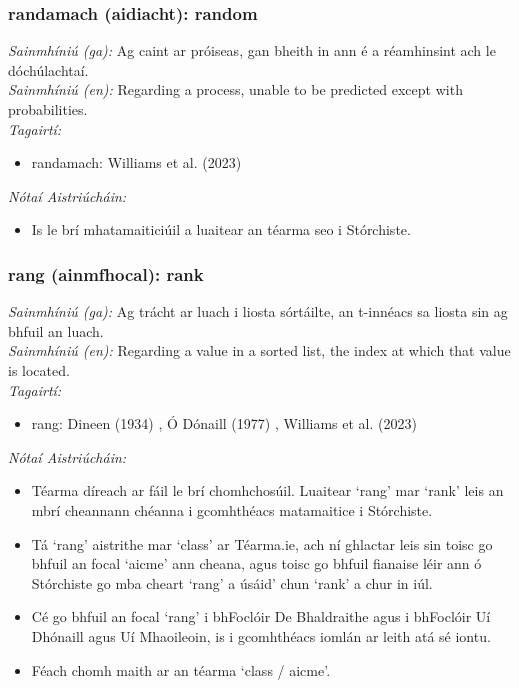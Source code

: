 \subsubsection*{randamach (aidiacht): random}
 \noindent \textit{Sainmhíniú (ga):} Ag caint ar próiseas, gan bheith in ann é a réamhinsint ach le dóchúlachtaí.
\\
 \noindent \textit{Sainmhíniú (en):} Regarding a process, unable to be predicted except with probabilities.
\\
 \noindent \textit{Tagairtí:}
\begin{itemize}
	\item randamach: Williams et al. (2023) \cite{storchiste}
\end{itemize}

 \noindent \textit{Nótaí Aistriúcháin:}
\begin{itemize}
	\item Is le brí mhatamaiticiúil a luaitear an téarma seo i Stórchiste.
\end{itemize}


\subsubsection*{rang (ainmfhocal): rank}
 \noindent \textit{Sainmhíniú (ga):} Ag trácht ar luach i liosta sórtáilte, an t-innéacs sa liosta sin ag bhfuil an luach.
\\
 \noindent \textit{Sainmhíniú (en):} Regarding a value in a sorted list, the index at which that value is located.
\\
 \noindent \textit{Tagairtí:}
\begin{itemize}
	\item rang: Dineen (1934) \cite{dineen}, Ó Dónaill (1977) \cite{odonaill}, Williams et al. (2023) \cite{storchiste}
\end{itemize}

 \noindent \textit{Nótaí Aistriúcháin:}
\begin{itemize}
	\item Téarma díreach ar fáil le brí chomhchosúil. Luaitear `rang' mar `rank' leis an mbrí cheannann chéanna i gcomhthéacs matamaitice i Stórchiste.
	\item Tá `rang' aistrithe mar `class' ar Téarma.ie, ach ní ghlactar leis sin toisc go bhfuil an focal `aicme' ann cheana, agus toisc go bhfuil fianaise léir ann ó Stórchiste go mba cheart `rang' a úsáid' chun `rank' a chur in iúl.
	\item Cé go bhfuil an focal `rang' i bhFoclóir De Bhaldraithe agus i bhFoclóir Uí Dhónaill agus Uí Mhaoileoin, is i gcomhthéacs iomlán ar leith atá sé iontu.
	\item Féach chomh maith ar an téarma `class / aicme'.
\end{itemize}


